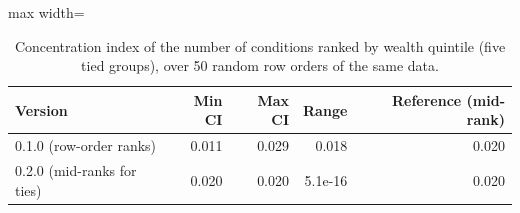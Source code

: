 \begin{table}[htbp]

\caption{\label{tab:tab_validation_ties}Concentration index of the number of conditions ranked by wealth quintile (five tied groups), over 50 random row orders of the same data.}
\centering
\small
\begin{adjustbox}{max width=\linewidth}
\begin{tabular}{lrrrr}
\toprule
Version & Min CI & Max CI & Range & Reference (mid-rank)\\
\midrule
0.1.0 (row-order ranks) & 0.011 & 0.029 & 0.018 & 0.020\\
0.2.0 (mid-ranks for ties) & 0.020 & 0.020 & 5.1e-16 & 0.020\\
\bottomrule
\end{tabular}
\end{adjustbox}
\end{table}
